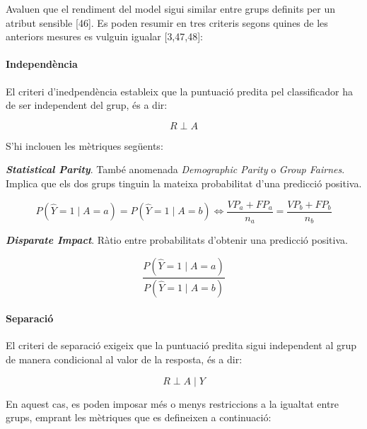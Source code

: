 \documentclass[CAT]{TFUOC}%
\begin{document}
Avaluen que el rendiment del model sigui similar entre grups definits per un atribut sensible {[}46{]}. Es poden resumir en tres criteris segons quines de les anteriors mesures es vulguin igualar {[}3,47,48{]}:

\paragraph{Independència}\label{independuxe8ncia}

El criteri d'inedpendència estableix que la puntuació predita pel classificador ha de ser independent del grup, és a dir:

\begin{equation}
R \perp A
\end{equation}

S'hi inclouen les mètriques següents:

\bigskip

\textbf{\emph{Statistical Parity}}. També anomenada \emph{Demographic Parity} o \emph{Group Fairnes}. Implica que els dos grups tinguin la mateixa probabilitat d'una predicció positiva.

\begin{equation}
P(\hat Y = 1 \mid A = a) = P(\hat Y = 1 \mid A = b) \Leftrightarrow \frac{VP_a + FP_a}{n_a} = \frac{VP_b + FP_b}{n_b}
\end{equation}

\textbf{\emph{Disparate Impact}}. Ràtio entre probabilitats d'obtenir una predicció positiva.

\begin{equation}
\frac{P(\hat Y = 1 \mid A = a)}{P(\hat Y = 1 \mid A = b)}
\end{equation}

\paragraph{Separació}\label{separaciuxf3}

El criteri de separació exigeix que la puntuació predita sigui independent al grup de manera condicional al valor de la resposta, és a dir:

\begin{equation}
R \perp A \mid Y
\end{equation}

En aquest cas, es poden imposar més o menys restriccions a la igualtat entre grups, emprant les mètriques que es defineixen a continuació:

\bigskip
\end{document}
